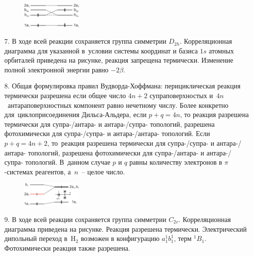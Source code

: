\begin{figure} %
    \centering
    \vspace{-1mm}
    \includegraphics[width=30mm]{images/Fig_2_1_7_dec.png}
    \vspace{-5mm}
\end{figure}
7. В ходе всей реакции сохраняется группа симметрии $D_{2h}$. Корреляционная диаграмма для указанной в~условии системы координат и базиса $1s$ атомных орбиталей приведена на рисунке, реакция запрещена термически. Изменение полной электронной энергии равно $-2\beta$.\par
8. Общая формулировка правил Вудворда-Хоффмана: перициклическая реакция термически разрешена если общее число $4n+2$ супраповерхностых и~$4n$~антараповерхностных компонент равно нечетному числу.  Более конкретно для~циклоприсоединения Дильса-Альдера, если $p+q=4n$, то реакция разрешена термически для супра-/антара- и антара-/супра- топологий, разрешена фотохимически для супра-/супра- и антара-/антара- топологий. Если $p+q=4n+2$, то~реакция разрешена термически для супра-/супра- и антара-/антара- топологий, разрешена фотохимически для супра-/антара- и антара-/супра- топологий. В~данном случае $p$ и $q$ равны количеству электронов в $\pi$-системах реагентов, а~$n$~– целое число.\par
\begin{figure} %
    \centering
    \vspace{0mm}
    \includegraphics[width=30mm]{images/Fig_2_1_9_dec.png}
    \vspace{-5mm}
\end{figure}
9. В ходе всей реакции сохраняется группа симметрии $C_{2v}$. Корреляционная диаграмма приведена на рисунке. Реакция разрешена термически. Электрический дипольный переход в~H$_2$ возможен в конфигурацию $a_1^1b_1^1$, терм $^1B_1$. Фотохимически реакция также разрешена.\par
